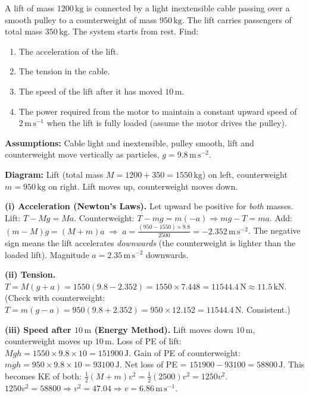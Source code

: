 \documentclass[11pt]{article}
\begin{document}
\begin{exoresolu}
A lift of mass $1200\,\mathrm{kg}$ is connected by a light inextensible cable passing over a smooth pulley to a counterweight of mass $950\,\mathrm{kg}$.  The lift carries passengers of total mass $350\,\mathrm{kg}$.  The system starts from rest.  Find:
\begin{enumerate}
\item The acceleration of the lift.
\item The tension in the cable.
\item The speed of the lift after it has moved $10\,\mathrm{m}$.
\item The power required from the motor to maintain a constant upward speed of $2\,\mathrm{m\,s^{-1}}$ when the lift is fully loaded (assume the motor drives the pulley).
\end{enumerate}
\tcblower
\textbf{Assumptions:} Cable light and inextensible, pulley smooth, lift and counterweight move vertically as particles, $g=9.8\,\mathrm{m\,s^{-2}}$.

\textbf{Diagram:} Lift (total mass $M = 1200+350 = 1550\,\mathrm{kg}$) on left, counterweight $m = 950\,\mathrm{kg}$ on right.  Lift moves up, counterweight moves down.

\textbf{(i) Acceleration (Newton's Laws).}
Let upward be positive for \emph{both} masses.
Lift: $T - Mg = M a$.
Counterweight: $T - mg = m(-a) \Rightarrow mg - T = ma$.
Add: $(m-M)g = (M+m)a \;\Rightarrow\; a = \frac{(950-1550)\times9.8}{2500} = -2.352\,\mathrm{m\,s^{-2}}$.
The negative sign means the lift accelerates \emph{downwards} (the counterweight is lighter than the loaded lift).  Magnitude $a = 2.35\,\mathrm{m\,s^{-2}}$ downwards.

\textbf{(ii) Tension.}
$T = M(g+a) = 1550(9.8 - 2.352) = 1550 \times 7.448 = 11544.4\,\mathrm{N} \approx 11.5\,\mathrm{kN}$.
(Check with counterweight: $T = m(g-a) = 950(9.8 + 2.352) = 950 \times 12.152 = 11544.4\,\mathrm{N}$.  Consistent.)

\textbf{(iii) Speed after $10\,\mathrm{m}$ (Energy Method).}
Lift moves down $10\,\mathrm{m}$, counterweight moves up $10\,\mathrm{m}$.
Loss of PE of lift: $Mgh = 1550 \times 9.8 \times 10 = 151900\,\mathrm{J}$.
Gain of PE of counterweight: $mgh = 950 \times 9.8 \times 10 = 93100\,\mathrm{J}$.
Net loss of PE = $151900 - 93100 = 58800\,\mathrm{J}$.
This becomes KE of both: $\frac{1}{2}(M+m)v^2 = \frac{1}{2}(2500)v^2 = 1250 v^2$.
$1250 v^2 = 58800 \Rightarrow v^2 = 47.04 \Rightarrow v = 6.86\,\mathrm{m\,s^{-1}}$.


\end{exoresolu}
\end{document}
